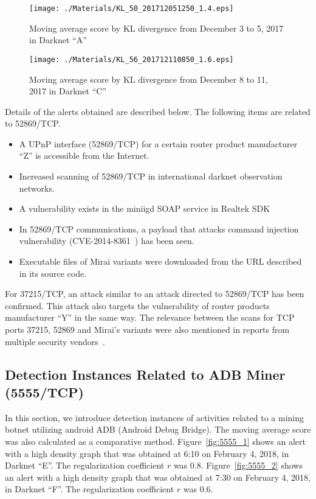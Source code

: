 \documentclass[letterpaper]{sig-alternate-10pt}
\begin{document}
\begin{figure}[htb]
\begin{center}
	\texttt{[image: ./Materials/KL\_50\_201712051250\_1.4.eps]}
	\caption{Moving average score by KL divergence from December 3 to 5, 2017 in Darknet ``A''}
  	\label{fig:KL_50}
	\vspace*{0.5cm}
	\texttt{[image: ./Materials/KL\_56\_201712110850\_1.6.eps]}
	\caption{Moving average score by KL divergence from December 8 to 11, 2017 in Darknet ``C''}
  	\label{fig:KL_56}
\end{center}
\end{figure}

Details of the alerts obtained are described below.
The following items are related to 52869/TCP.
\begin{itemize}
	\item  A UPnP interface (52869/TCP) for a certain router product manufacturer ``Z'' is accessible from the Internet.
	\item Increased scanning of 52869/TCP in international darknet observation networks.
	\item A vulnerability exists in the miniigd SOAP service in Realtek SDK~\cite{Zeroday}
	\item In 52869/TCP communications, a payload that attacks command injection vulnerability (CVE-2014-8361~\cite{CVE}) has been seen.
	\item Executable files of Mirai variants were downloaded from the URL described in its source code.
\end{itemize}
For 37215/TCP, an attack similar to an attack directed to 52869/TCP has been confirmed.
This attack also targets the vulnerability of router products manufacturer ``Y'' in the same way.
The relevance between the scans for TCP ports 37215, 52869 and Mirai's variants were also mentioned in reports from multiple security vendors~\cite{Netlab2,Rise}.

\subsection{Detection Instances Related to ADB Miner (5555/TCP)}
In this section, we introduce detection instances of activities related to a mining botnet utilizing android ADB (Android Debug Bridge).
The moving average score was also calculated as a comparative method.
Figure~\ref{fig:5555_1} shows an alert with a high density graph that was obtained at 6:10 on February 4, 2018, in Darknet ``E''.
The regularization coefficient $r$ was 0.8.
Figure~\ref{fig:5555_2} shows an alert with a high density graph that was obtained at 7:30 on February 4, 2018, in Darknet ``F''.
The regularization coefficient $r$ was 0.6.
\end{document}
